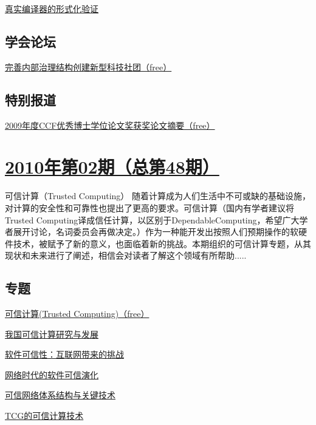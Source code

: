 \documentclass[a4paper]{article}
\begin{document}
\href{http://history.ccf.org.cn/resources/1190201776262/2010/04/23/20103-18.pdf}{真实编译器的形式化验证}

\subsection{学会论坛}
\href{http://history.ccf.org.cn/resources/1190201776262/2010/04/23/20103-19.pdf}{完善内部治理结构创建新型科技社团（free）}

\subsection{特别报道}
\href{http://history.ccf.org.cn/resources/1190201776262/2010/04/23/20103-1.pdf}{2009年度CCF优秀博士学位论文奖获奖论文摘要（free）}


\section{\href{http://history.ccf.org.cn/sites/ccf/jsjtbbd.jsp?contentId=2543828071281}{\textbf{2010年第02期（总第48期）}}}
可信计算（Trusted Computing） 随着计算成为人们生活中不可或缺的基础设施，对计算的安全性和可靠性也提出了更高的要求。可信计算（国内有学者建议将Trusted Computing译成信任计算，以区别于DependableComputing，希望广大学者展开讨论，名词委员会再做决定。）作为一种能开发出按照人们预期操作的软硬件技术，被赋予了新的意义，也面临着新的挑战。本期组织的可信计算专题，从其现状和未来进行了阐述，相信会对读者了解这个领域有所帮助.....
\subsection{专题}
\href{http://history.ccf.org.cn/resources/1190201776262/2010/04/23/201002-1.pdf}{可信计算(Trusted Computing)（free）}

\href{http://history.ccf.org.cn/resources/1190201776262/2010/04/23/2010.2-2.pdf}{我国可信计算研究与发展}

\href{http://history.ccf.org.cn/resources/1190201776262/2010/04/23/2010.2-3.pdf}{软件可信性：互联网带来的挑战}

\href{http://history.ccf.org.cn/resources/1190201776262/2010/05/31/2010.2-4.pdf}{网络时代的软件可信演化}

\href{http://history.ccf.org.cn/resources/1190201776262/2010/04/23/2010.2-5.pdf}{可信网络体系结构与关键技术}

\href{http://history.ccf.org.cn/resources/1190201776262/2010/05/31/2010.2-6.pdf}{TCG的可信计算技术}
\end{document}
